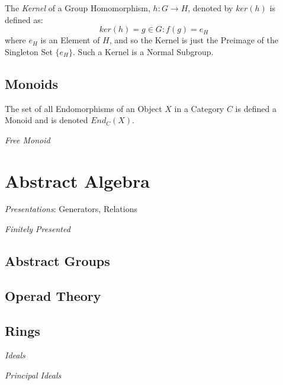 The \emph{Kernel} of a Group Homomorphism, $h : G \rightarrow H$,
denoted by $ker(h)$ is defined as:
\[
    ker(h) = {g \in G : f(g) = e_H}
\]
where $e_H$ is an Element of $H$, and so the Kernel is just the
Preimage of the Singleton Set $\{e_H\}$. Such a Kernel is a Normal
Subgroup.

\subsection{Monoids}\label{subsec:monoids}

The set of all Endomorphisms of an Object $X$ in a Category $C$ is
defined a Monoid and is denoted $End_C(X)$.

\emph{Free Monoid}

\section{Abstract Algebra}\label{sec:abstract_algebra}
\emph{Presentations}: Generators, Relations

\emph{Finitely Presented}
\subsection{Abstract Groups}\label{subsec:abstract_groups}
\subsection{Operad Theory}\label{subsec:operad_theory}
\subsection{Rings}\label{subsec:rings}
\emph{Ideals}

\emph{Principal Ideals}
